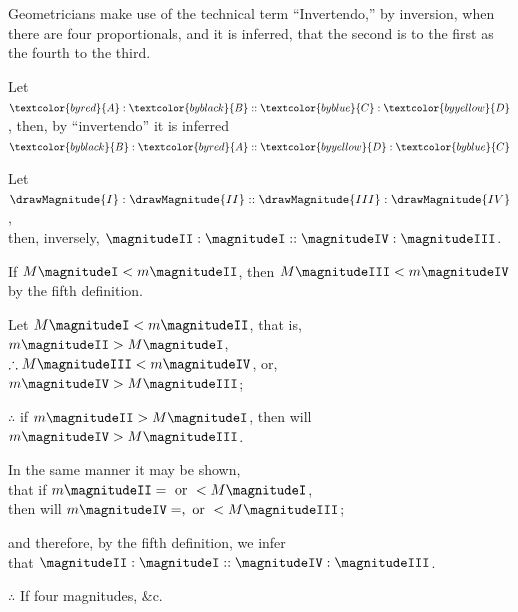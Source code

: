 \documentclass[booklanguage=english]{byrnebook}
\begin{document}
\label{def:V.XIV} 
\def\varA{\textcolor{byred}{A}}
\def\varB{\textcolor{byblack}{B}}
\def\varC{\textcolor{byblue}{C}}
\def\varD{\textcolor{byyellow}{D}}
Geometricians make use of the technical term \enquote{Invertendo,} by inversion, when there are four proportionals, and it is inferred, that the second is to the first as the fourth to the third.

Let $\varA : \varB :: \varC : \varD$, then, by \enquote{invertendo} it is inferred $\varB : \varA :: \varD : \varC$

\vfill\pagebreak

\label{prop:V.B} %

\begin{center}
Let $\drawMagnitude{I} : \drawMagnitude{II} :: \drawMagnitude{III} : \drawMagnitude{IV}$,\\
then, inversely, $\magnitudeII : \magnitudeI :: \magnitudeIV : \magnitudeIII$.

If $M \magnitudeI < m \magnitudeII$, then $M \magnitudeIII < m \magnitudeIV$\\
by the fifth definition.

Let $M \magnitudeI < m \magnitudeII$, that is, $m \magnitudeII > M \magnitudeI$,\\
$\therefore M \magnitudeIII < m \magnitudeIV$, or, $m \magnitudeIV > M \magnitudeIII$;

$\therefore$ if $m \magnitudeII > M \magnitudeI$, then will $m \magnitudeIV > M \magnitudeIII$.

In the same manner it may be shown,\\
that if $m \magnitudeII = \mbox{ or } < M \magnitudeI$,\\
then will $m \magnitudeIV =, \mbox{ or } < M \magnitudeIII$;

and therefore, by the fifth definition, we infer\\
that $\magnitudeII : \magnitudeI :: \magnitudeIV : \magnitudeIII$.

$\therefore$ If four magnitudes, \&c.
\end{center}

\vfill\pagebreak
\end{document}
